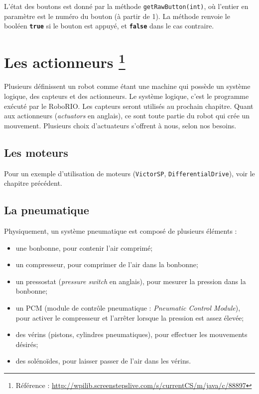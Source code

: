 \documentclass[12pt]{report}
\begin{document}
L'état des boutons est donné par la méthode \texttt{getRawButton(int)}, où l'entier en paramètre est le numéro du bouton (à partir de 1). La méthode renvoie le booléen \texttt{\bfseries true} si le bouton est appuyé, et \texttt{\bfseries false} dans le cas contraire.



\chapter[Les actionneurs]{Les actionneurs \footnote{Référence : \url{http://wpilib.screenstepslive.com/s/currentCS/m/java/c/88897}}}

Plusieurs définissent un robot comme étant une machine qui possède un système logique, des capteurs et des actionneurs. Le système logique, c'est le programme exécuté par le RoboRIO. Les capteurs seront utilisés au prochain chapitre. Quant aux actionneurs (\textit{actuators} en anglais), ce sont toute partie du robot qui crée un mouvement. Plusieurs choix d'actuateurs s'offrent à nous, selon nos besoins.

\section{Les moteurs}
Pour un exemple d'utilisation de moteurs (\texttt{VictorSP}, \texttt{DifferentialDrive}), voir le chapitre précédent.

\section{La pneumatique}
Physiquement, un système pneumatique est composé de plusieurs éléments :

\begin{itemize}
	\item une bonbonne, pour contenir l'air comprimé;
	\item un compresseur, pour comprimer de l'air dans la bonbonne;
	\item un pressostat (\textit{pressure switch} en anglais), pour mesurer la pression dans la bonbonne;
	\item un PCM (module de contrôle pneumatique : \textit{Pneumatic Control Module}), pour activer le compresseur et l'arrêter lorsque la pression est assez élevée;
	\item des vérins (pistons, cylindres pneumatiques), pour effectuer les mouvements désirés;
	\item des solénoïdes, pour laisser passer de l'air dans les vérins.
\end{itemize}
\end{document}
